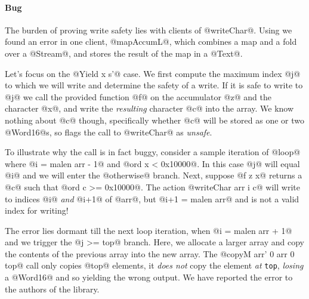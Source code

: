 \paragraph{Bug}
The burden of proving write safety lies with 
clients of @writeChar@. Using \toolname we found an error in 
one client, @mapAccumL@, which combines
a map and a fold over a @Stream@, and 
stores the result of the map in a @Text@.
%
%
Let's focus on the @Yield x s'@ case.
%
We first compute the maximum index @j@ to 
which we will write and determine the safety of a write. 
%
If it is safe to write to @j@ we call the provided 
function @f@ on the accumulator @z@ and the character 
@x@, and write the \emph{resulting} character @c@ into the array. 
%
We know nothing about @c@ though, specifically
whether @c@ will be stored as one or two @Word16@s, 
so \toolname flags the call to @writeChar@ as \emph{unsafe}.

To illustrate why the call is in fact buggy, 
consider a sample iteration of @loop@ 
where @i = malen arr - 1@ and
@ord x < 0x10000@. 
%
In this case @j@ will equal @i@ and we will enter
the @otherwise@ branch. 
%
Next, suppose @f z x@ returns a
@c@ such that  @ord c >= 0x10000@. 
%
The action @writeChar arr i c@ will write to
indices @i@ \emph{and} @i+1@ of @arr@, but 
@i+1 = malen arr@ and is not a valid index 
for writing! 

The error lies dormant till the next loop 
iteration, when @i = malen arr + 1@ and we 
trigger the @j >= top@ branch. 
%
Here, we allocate a larger array and copy 
the contents of the previous array into the 
new array. 
%
The @copyM arr' 0 arr 0 top@ call
only copies @top@ elements, \ie it 
\emph{does not}
copy the element \emph{at} \texttt{top},
\emph{losing} a @Word16@ and so 
yielding the wrong  output.
We have reported the error to the authors of the library.
